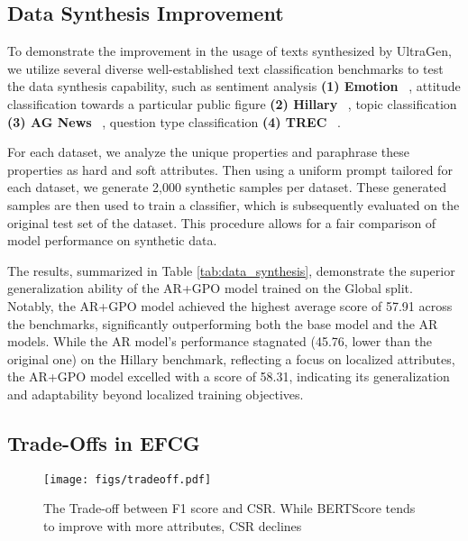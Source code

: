 \subsection{Data Synthesis Improvement}


To demonstrate the improvement in the usage of texts synthesized by UltraGen, we utilize several diverse well-established text classification benchmarks to test the data synthesis capability, such as sentiment analysis \textbf{(1) Emotion} ~\cite{saravia-etal-2018-carer}, attitude classification towards a particular public figure \textbf{(2) Hillary} ~\cite{barbieri2020tweeteval}, topic classification \textbf{(3) AG News} ~\cite{Zhang2015CharacterlevelCN}, question type classification \textbf{(4) TREC} ~\cite{li-roth-2002-learning}.

For each dataset, we analyze the unique properties and paraphrase these properties as hard and soft attributes. Then using a uniform prompt tailored for each dataset, we generate 2,000 synthetic samples per dataset. These generated samples are then used to train a classifier, which is subsequently evaluated on the original test set of the dataset. This procedure allows for a fair comparison of model performance on synthetic data. 

The results, summarized in Table \ref{tab:data_synthesis}, demonstrate the superior generalization ability of the AR+GPO model trained on the Global split. Notably, the AR+GPO model achieved the highest average score of 57.91 across the benchmarks, significantly outperforming both the base model and the AR models. While the AR model’s performance stagnated (45.76, lower than the original one) on the Hillary benchmark, reflecting a focus on localized attributes, the AR+GPO model excelled with a score of 58.31, indicating its generalization and adaptability beyond localized training objectives.

\subsection{Trade-Offs in EFCG}
\begin{figure}[t]
    \centering
        \texttt{[image: figs/tradeoff.pdf]}
    \caption{The Trade-off between F1 score and CSR. While BERTScore tends to improve with more attributes, CSR declines}
    \vspace{-1.5em}
    \label{fig:tradeoff}
\end{figure}


